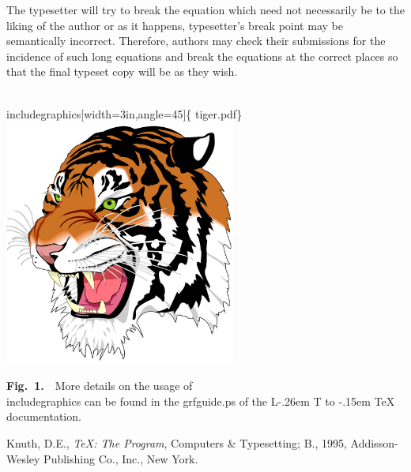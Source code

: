 \documentclass[a4paper,12pt]{article}
\makeatletter
\def\bs{\expandafter\@gobble\string\\}
\def\lb{\expandafter\@gobble\string\{}
\def\rb{\expandafter\@gobble\string\}}
\DeclareRobustCommand{\LaTeX}{L\kern-.26em%
        {\sbox\z@ T%
         \vbox to\ht\z@{\hbox{\check@mathfonts
           \fontsize\sf@size\z@
           \math@fontsfalse\selectfont
          A\,}%
         \vss}%
        }%
     \kern-.15em%
    \TeX}
\makeatother
\begin{document}
\newpage\vspace*{-18pt}
\def\rulecolor{blue!70}
\def\rulecolor{orange}

\medskip

\noindent The typesetter will try to break the equation which
need not necessarily be to the liking of the author or as it
happens, typesetter's break point may be semantically incorrect.
Therefore, authors may check their submissions for the incidence
of such long equations and break the equations at the correct
places so that the final typeset copy will be as they wish.

\begin{toolwrite}{10cm}
\centering
 {\ttfamily\bs includegraphics[width=3in,angle=45]\lb
 tiger.pdf\rb}\\
 \hspace*{-1cm}
 \includegraphics[width=3in,angle=45,origin=c]{tiger.pdf}\\
 \raggedright
 \textbf{Fig.~1.}~~More details on the usage of {\ttfamily\bs
 includegraphics} can be found in the \textsf{grfguide.ps} of the
 \LaTeX{} documentation.
\end{toolwrite}

\begin{toolwrite}{15cm}
\raggedright
\begin{enumerate}[{[1]}]
\item Knuth, D.E., \emph{TeX: The Program}, Computers \&
Typesetting; B., 1995, Addisson-Wesley Publishing Co., Inc., New
York.
\end{enumerate}
\end{toolwrite}


 
\end{document}
